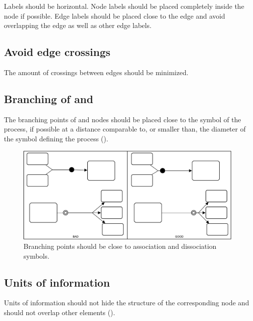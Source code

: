 Labels should be horizontal. Node labels should be placed completely
inside the node if possible. Edge labels should be placed close to
the edge and avoid overlapping the edge as well as other edge
labels.

\subsection{Avoid edge crossings}

The amount of crossings between edges should be minimized.

\subsection{Branching of  and }

The branching points of  and  nodes should be placed close to the symbol of the process, if possible at a distance comparable to, or smaller than, the diameter of the symbol defining the process ().

\begin{figure}[htb]
  \centering
  \includegraphics[scale=0.5]{images/layout-branching}
  \caption{Branching points should be close to association and dissociation symbols.}\label{fig:branching}
\end{figure}

\subsection{Units of information}

Units of information should not hide the structure of the
corresponding node and should not overlap other
elements ().


